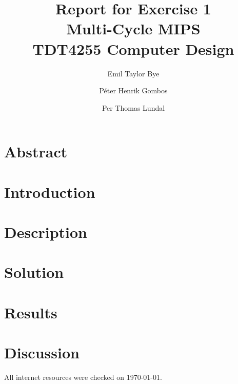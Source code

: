 \documentclass[a4paper]{article}
\begin{document}

\title{Report for Exercise 1\\Multi-Cycle MIPS\\\vspace{2mm}\Large{TDT4255 Computer Design}}

\author{Emil Taylor Bye \and Péter Henrik Gombos \and Per Thomas Lundal}



\maketitle


\bigskip
\bigskip
\bigskip
\bigskip

\part*{Abstract}



\clearpage

\tableofcontents

\setcounter{secnumdepth}{3}

\clearpage

\setcounter{page}{1}

\part{Introduction}



\clearpage

\part{Description}



\clearpage

\part{Solution}



\clearpage

\part{Results}



\clearpage

\part{Discussion}



\clearpage

{}

\nocite{*}
All internet resources were checked on \today.
\end{document}
